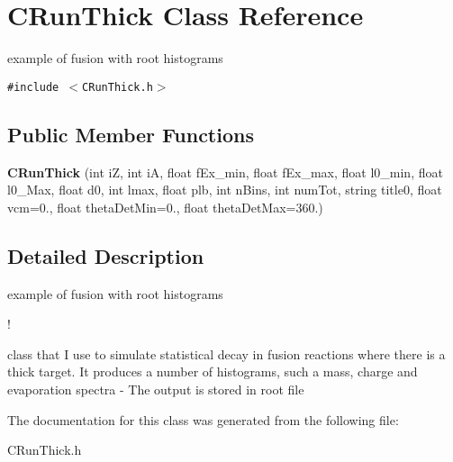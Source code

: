 \section{CRun\-Thick Class Reference}
\label{classCRunThick}
example of fusion with root histograms  


{\tt \#include $<$CRun\-Thick.h$>$}

\subsection*{Public Member Functions}
\begin{CompactItemize}
\item 
\textbf{CRun\-Thick} (int i\-Z, int i\-A, float f\-Ex\_\-min, float f\-Ex\_\-max, float l0\_\-min, float l0\_\-Max, float d0, int lmax, float plb, int n\-Bins, int num\-Tot, string title0, float vcm=0., float theta\-Det\-Min=0., float theta\-Det\-Max=360.)\label{classCRunThick_e3d2dd1c5910701d1859181a67036be0}

\end{CompactItemize}


\subsection{Detailed Description}
example of fusion with root histograms 

!

class that I use to simulate statistical decay in fusion reactions where there is a thick target. It produces a number of histograms, such a mass, charge and evaporation spectra - The output is stored in root file 



The documentation for this class was generated from the following file:\begin{CompactItemize}
\item 
CRun\-Thick.h\end{CompactItemize}
